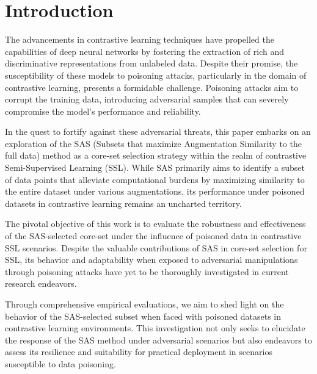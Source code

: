 \section{Introduction}

\iffalse
\begin{enumerate}
    \item Set the context with background information.
    \item Outline the problem or question addressed.
    \item State the objectives and provide a roadmap for the study.
    \item Offer a more detailed narrative compared to the abstract.
\end{enumerate}
\fi

The advancements in contrastive learning techniques have propelled the capabilities of deep neural networks by fostering the extraction of rich and discriminative representations from unlabeled data. Despite their promise, the susceptibility of these models to poisoning attacks, particularly in the domain of contrastive learning, presents a formidable challenge. Poisoning attacks aim to corrupt the training data, introducing adversarial samples that can severely compromise the model's performance and reliability.

In the quest to fortify against these adversarial threats, this paper embarks on an exploration of the SAS (Subsets that maximize Augmentation Similarity to the full data) method as a core-set selection strategy within the realm of contrastive Semi-Supervised Learning (SSL). While SAS primarily aims to identify a subset of data points that alleviate computational burdens by maximizing similarity to the entire dataset under various augmentations, its performance under poisoned datasets in contrastive learning remains an uncharted territory.

The pivotal objective of this work is to evaluate the robustness and effectiveness of the SAS-selected core-set under the influence of poisoned data in contrastive SSL scenarios. Despite the valuable contributions of SAS in core-set selection for SSL, its behavior and adaptability when exposed to adversarial manipulations through poisoning attacks have yet to be thoroughly investigated in current research endeavors.

Through comprehensive empirical evaluations, we aim to shed light on the behavior of the SAS-selected subset when faced with poisoned datasets in contrastive learning environments. This investigation not only seeks to elucidate the response of the SAS method under adversarial scenarios but also endeavors to assess its resilience and suitability for practical deployment in scenarios susceptible to data poisoning.

